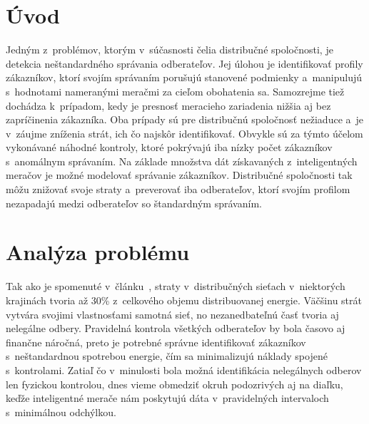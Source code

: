 \documentclass[a4paper,twoside,slovak,12pt,appendix]{article}
\begin{document}
\newpage
\setcounter{page}{1}
\section{Úvod}
Jedným z~problémov, ktorým v~súčasnosti čelia distribučné spoločnosti, je
detekcia neštandardného správania odberateľov. Jej úlohou je identifikovať
profily zákazníkov, ktorí svojím správaním porušujú stanovené podmienky
a~manipulujú s~hodnotami nameranými meračmi za cieľom obohatenia sa. Samozrejme
tiež dochádza k~prípadom, kedy je presnosť meracieho zariadenia nižšia aj bez
zapríčinenia zákazníka. Oba prípady sú pre distribučnú spoločnosť nežiaduce a~je
v~záujme zníženia strát, ich čo najskôr identifikovať. Obvykle sú za týmto
účelom vykonávané náhodné kontroly, ktoré pokrývajú iba nízky počet zákazníkov
s~anomálnym správaním. Na základe množstva dát získavaných z~inteligentných
meračov je možné modelovať správanie zákazníkov. Distribučné spoločnosti tak
môžu znižovať svoje straty a~preverovať iba odberateľov, ktorí svojím profilom
nezapadajú medzi odberateľov so štandardným správaním.

\newpage\null\thispagestyle{empty}\newpage


\newpage
\section{Analýza problému}
\label{c:problem-analysis}
Tak ako je spomenuté v~článku~\cite{Meffe2009}, straty v~distribučných sieťach
v~niektorých krajinách tvoria až 30\% z~celkového objemu distribuovanej energie.
Väčšinu strát vytvára svojimi vlastnosťami samotná sieť, no nezanedbateľnú časť
tvoria aj nelegálne odbery. Pravidelná kontrola všetkých odberateľov by bola
časovo aj finančne náročná, preto je potrebné správne identifikovať zákazníkov
s~neštandardnou spotrebou energie, čím sa minimalizujú náklady spojené
s~kontrolami. Zatiaľ čo v~minulosti bola možná identifikácia nelegálnych odberov
len fyzickou kontrolou, dnes vieme obmedziť okruh podozrivých aj na diaľku,
keďže inteligentné merače nám poskytujú dáta v~pravidelných intervaloch
s~minimálnou odchýlkou.
\end{document}
